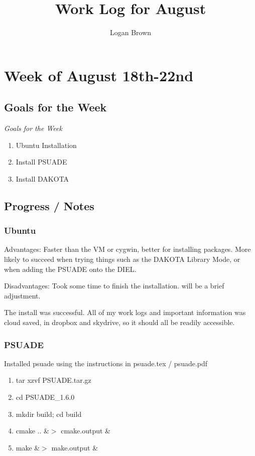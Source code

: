 \documentclass[11pt]{article} %
\title{Work Log for August}
\author{Logan Brown}
\begin{document}
\maketitle


\setcounter{section}{02} %
\setcounter{subsection}{-1}
\setcounter{subsubsection}{0}

\section{Week of August 18th-22nd}
\subsection{Goals for the Week}
\textit{Goals for the Week}
\begin{enumerate}
\item Ubuntu Installation
\item Install PSUADE
\item Install DAKOTA

\end{enumerate}

\subsection{Progress / Notes}
\subsubsection{Ubuntu}
Advantages: Faster than the VM or cygwin, better for installing packages. More likely to succeed when trying things such as the DAKOTA Library Mode, or when adding the PSUADE onto the DIEL.

Disadvantages: Took some time to finish the installation. will be a brief adjustment.

The install was successful. All of my work logs and important information was cloud saved, in dropbox and skydrive, so it should all be readily accessible.


\subsubsection{PSUADE}

Installed psuade using the instructions in psuade.tex / psuade.pdf

\begin{enumerate}
\item tar xzvf PSUADE.tar.gz
\item cd PSUADE\_1.6.0
\item mkdir build; cd build
\item cmake .. \&$>$ cmake.output \&
\item make \&$>$ make.output \&
\end{enumerate}
\end{document}
